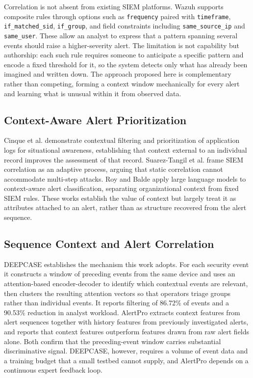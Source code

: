 \documentclass[conference]{IEEEtran}
\begin{document}
Correlation is not absent from existing SIEM platforms. Wazuh supports composite rules through options such as \texttt{frequency} paired with \texttt{timeframe}, \texttt{if\_matched\_sid}, \texttt{if\_group}, and field constraints including \texttt{same\_source\_ip} and \texttt{same\_user}. These allow an analyst to express that a pattern spanning several events should raise a higher-severity alert. The limitation is not capability but authorship: each such rule requires someone to anticipate a specific pattern and encode a fixed threshold for it, so the system detects only what has already been imagined and written down. The approach proposed here is complementary rather than competing, forming a context window mechanically for every alert and learning what is unusual within it from observed data.

\subsection{Context-Aware Alert Prioritization}

Cinque et al. \cite{ref7} demonstrate contextual filtering and prioritization of application logs for situational awareness, establishing that context external to an individual record improves the assessment of that record. Suarez-Tangil et al. \cite{ref6} frame SIEM correlation as an adaptive process, arguing that static correlation cannot accommodate multi-step attacks. Roy and Balde \cite{ref1} apply large language models to context-aware alert classification, separating organizational context from fixed SIEM rules. These works establish the value of context but largely treat it as attributes attached to an alert, rather than as structure recovered from the alert sequence.

\subsection{Sequence Context and Alert Correlation}

DEEPCASE \cite{ref15} establishes the mechanism this work adopts. For each security event it constructs a window of preceding events from the same device and uses an attention-based encoder-decoder to identify which contextual events are relevant, then clusters the resulting attention vectors so that operators triage groups rather than individual events. It reports filtering of 86.72\% of events and a 90.53\% reduction in analyst workload. AlertPro \cite{ref5} extracts context features from alert sequences together with history features from previously investigated alerts, and reports that context features outperform features drawn from raw alert fields alone. Both confirm that the preceding-event window carries substantial discriminative signal. DEEPCASE, however, requires a volume of event data and a training budget that a small testbed cannot supply, and AlertPro depends on a continuous expert feedback loop.
\end{document}
